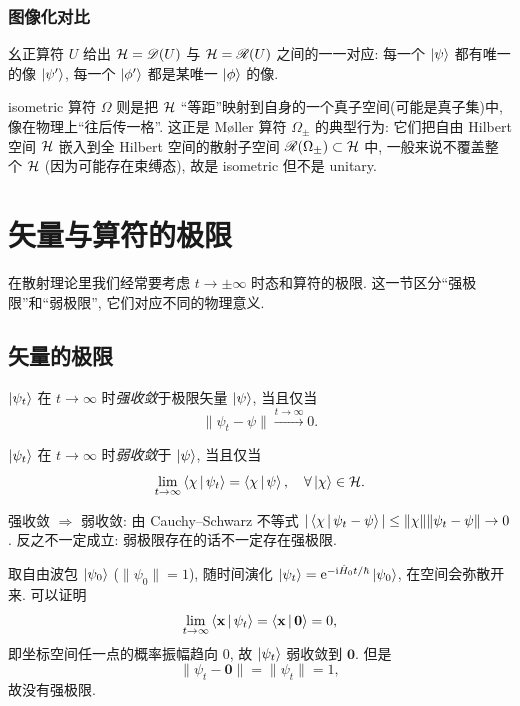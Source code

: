 \subsubsection{图像化对比}

幺正算符 $U$ 给出 $\mathcal{H}=\mathscr D(U)$ 与 $\mathcal{H}=\mathscr R(U)$ 之间的一一对应: 每一个 $\ket\psi$ 都有唯一的像 $\ket{\psi'}$, 每一个 $\ket{\phi'}$ 都是某唯一 $\ket\phi$ 的像.

isometric 算符 $\Omega$ 则是把 $\mathcal{H}$ ``等距''映射到自身的一个真子空间(可能是真子集)中, 像在物理上``往后传一格''. 这正是 M\o ller 算符 $\Omega_{\pm}$ 的典型行为: 它们把自由 Hilbert 空间 $\mathcal{H}$ 嵌入到全 Hilbert 空间的散射子空间 $\mathscr R(\Omega_\pm)\subset\mathcal{H}$ 中, 一般来说不覆盖整个 $\mathcal{H}$ (因为可能存在束缚态), 故是 isometric 但不是 unitary.

\section{矢量与算符的极限}\label{sec:limits}

在散射理论里我们经常要考虑 $t\to\pm\infty$ 时态和算符的极限. 这一节区分``强极限''和``弱极限'', 它们对应不同的物理意义.

\subsection{矢量的极限}

\begin{definition}[强极限]
$\ket{\psi_t}$ 在 $t\to\infty$ 时\emph{强收敛}于极限矢量 $\ket\psi$, 当且仅当
\begin{equation}
\|\psi_t-\psi\|\xrightarrow{t\to\infty}0.
\end{equation}
\end{definition}

\begin{definition}[弱极限]
$\ket{\psi_t}$ 在 $t\to\infty$ 时\emph{弱收敛}于 $\ket\psi$, 当且仅当
\begin{equation}
\lim_{t\to\infty}\left\langle \chi \,\middle|\, \psi_t \right\rangle=\left\langle \chi \,\middle|\, \psi \right\rangle,\quad \forall \ket\chi\in\mathcal{H}.
\end{equation}
\end{definition}

强收敛 $\Rightarrow$ 弱收敛: 由 Cauchy--Schwarz 不等式 $|\left\langle \chi \,\middle|\, \psi_t-\psi \right\rangle|\leq\|\chi\|\|\psi_t-\psi\|\to 0$. 反之不一定成立: 弱极限存在的话不一定存在强极限.

\begin{example}[自由波包]
取自由波包 $\ket{\psi_0}$ ($\|\psi_0\|=1$), 随时间演化 $\ket{\psi_t}=\mathrm{e}^{-\mathrm{i}\hat{H}_0 t/\hbar}\ket{\psi_0}$, 在空间会弥散开来. 可以证明
\begin{equation}
\lim_{t\to\infty}\left\langle \mathbf x \,\middle|\, \psi_t \right\rangle=\left\langle \mathbf x \,\middle|\, \mathbf 0 \right\rangle=0,
\end{equation}
即坐标空间任一点的概率振幅趋向 $0$, 故 $\ket{\psi_t}$ 弱收敛到 $\mathbf 0$. 但是
\begin{equation}
\|\psi_t-\mathbf 0\|=\|\psi_t\|=1,
\end{equation}
故没有强极限.
\end{example}

